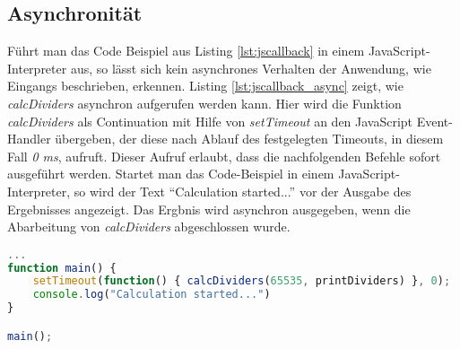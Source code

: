 \subsection*{Asynchronität}
Führt man das Code Beispiel aus Listing \ref{lst:jscallback} in einem JavaScript-Interpreter aus, so lässt sich kein asynchrones Verhalten der Anwendung, wie Eingangs beschrieben, erkennen. Listing \ref{lst:jscallback_async} zeigt, wie \textit{calcDividers} asynchron aufgerufen werden kann. Hier wird die Funktion \mbox{\textit{calcDividers}} als Continuation mit Hilfe von \textit{setTimeout} an den JavaScript Event-Handler übergeben, der diese nach Ablauf des festgelegten Timeouts, in diesem Fall \textit{0 ms}, aufruft. Dieser Aufruf erlaubt, dass die nachfolgenden Befehle sofort ausgeführt werden. Startet man das Code-Beispiel in einem JavaScript-Interpreter, so wird der Text ``Calculation started...'' vor der Ausgabe des Ergebnisses angezeigt. Das Ergbnis wird asynchron ausgegeben, wenn die Abarbeitung von \textit{calcDividers} abgeschlossen wurde.
\begin{lstlisting}[language=JavaScript,caption=JavaScript setTimeout Beispiel,label=lst:jscallback_async]
...
function main() {
	setTimeout(function() { calcDividers(65535, printDividers) }, 0);
	console.log("Calculation started...")
}

main();
\end{lstlisting}
\acresetall

